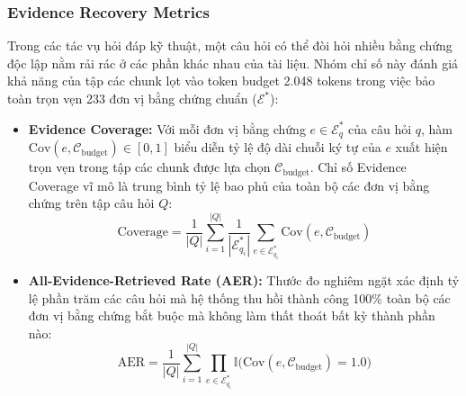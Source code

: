 \subsubsection{Evidence Recovery Metrics}
Trong các tác vụ hỏi đáp kỹ thuật, một câu hỏi có thể đòi hỏi nhiều bằng chứng độc lập nằm rải rác ở các phần khác nhau của tài liệu. Nhóm chỉ số này đánh giá khả năng của tập các chunk lọt vào token budget 2.048 tokens trong việc bảo toàn trọn vẹn 233 đơn vị bằng chứng chuẩn ($\mathcal{E}^*$):
\begin{itemize}
    \item \textbf{Evidence Coverage:} Với mỗi đơn vị bằng chứng $e \in \mathcal{E}^*_q$ của câu hỏi $q$, hàm $\text{Cov}(e, \mathcal{C}_{\text{budget}}) \in [0, 1]$ biểu diễn tỷ lệ độ dài chuỗi ký tự của $e$ xuất hiện trọn vẹn trong tập các chunk được lựa chọn $\mathcal{C}_{\text{budget}}$. Chỉ số Evidence Coverage vĩ mô là trung bình tỷ lệ bao phủ của toàn bộ các đơn vị bằng chứng trên tập câu hỏi $Q$:
    \begin{equation}
    \text{Coverage} = \frac{1}{|Q|} \sum_{i=1}^{|Q|} \frac{1}{|\mathcal{E}^*_{q_i}|} \sum_{e \in \mathcal{E}^*_{q_i}} \text{Cov}(e, \mathcal{C}_{\text{budget}})
    \label{eq:evidence_coverage}
    \end{equation}

    \item \textbf{All-Evidence-Retrieved Rate (AER):} Thước đo nghiêm ngặt xác định tỷ lệ phần trăm các câu hỏi mà hệ thống thu hồi thành công 100\% toàn bộ các đơn vị bằng chứng bắt buộc mà không làm thất thoát bất kỳ thành phần nào:
    \begin{equation}
    \text{AER} = \frac{1}{|Q|} \sum_{i=1}^{|Q|} \prod_{e \in \mathcal{E}^*_{q_i}} \mathbb{I}\Big( \text{Cov}(e, \mathcal{C}_{\text{budget}}) = 1.0 \Big)
    \label{eq:aer}
    \end{equation}
\end{itemize}

